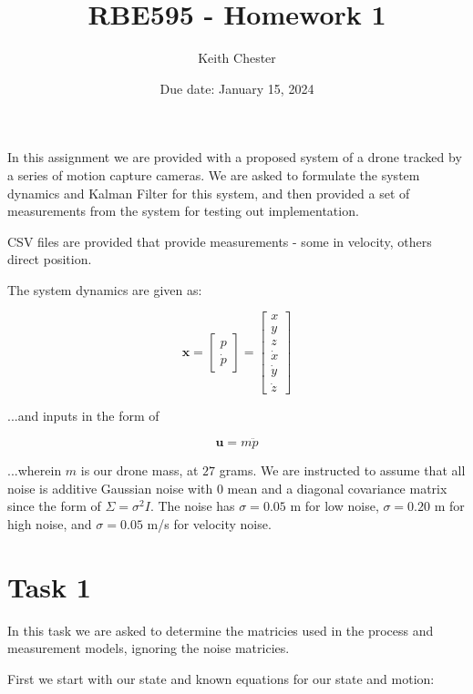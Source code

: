 \documentclass{article}
\title{RBE595 - Homework 1}
\author{Keith Chester}
\date{Due date: January 15, 2024}
\begin{document}
\maketitle

In this assignment we are provided with a proposed system of a drone tracked by a series of motion capture cameras. We are asked to formulate the system dynamics and Kalman Filter for this system, and then provided a set of measurements from the system for testing out implementation.

CSV files are provided that provide measurements - some in velocity, others direct position.

The system dynamics are given as:

\begin{equation}
    \textbf{x} = \begin{bmatrix}
        p \\ \dot{p}
    \end{bmatrix} =
    \begin{bmatrix}
        x       \\ y \\ z \\
        \dot{x} \\ \dot{y} \\ \dot{z}
    \end{bmatrix}
\end{equation}

...and inputs in the form of

\begin{equation}
    \textbf{u} = m \textbf{$\ddot{p}$}
\end{equation}

...wherein $m$ is our drone mass, at $27$ grams. We are instructed to assume that all noise is additive Gaussian noise with 0 mean and a diagonal covariance matrix since the form of $\Sigma=\sigma^2 I$. The noise has $\sigma=0.05$ m for low noise, $\sigma=0.20$ m for high noise, and $\sigma=0.05$ m/s for velocity noise.

\section*{Task 1}

In this task we are asked to determine the matricies used in the process and measurement models, ignoring the noise matricies.

First we start with our state and known equations for our state and motion:
\end{document}
